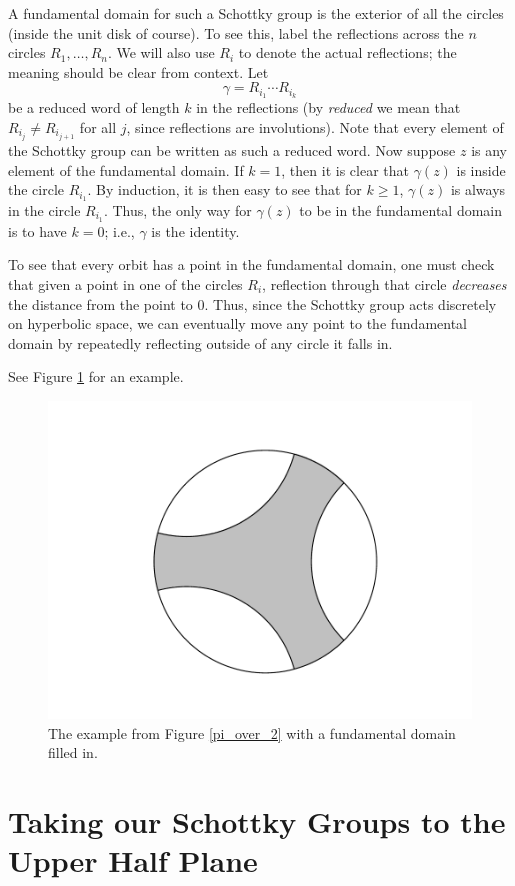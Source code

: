 \documentclass[]{article}
\begin{document}
A fundamental domain for such a Schottky group is the exterior of all the circles (inside the unit disk of course).
To see this, label the reflections across the $n$ circles $R_1, \dots, R_n$.
We will also use $R_i$ to denote the actual reflections; the meaning should be clear from context.
Let
$$
\gamma = R_{i_1}\cdots R_{i_k}
$$
be a reduced word of length $k$ in the reflections (by \textit{reduced} we mean that $R_{i_j} \neq R_{i_{j+1}}$ for all $j$, since reflections are involutions).
Note that every element of the Schottky group can be written as such a reduced word.
Now suppose $z$ is any element of the fundamental domain.
If $k = 1$, then it is clear that $\gamma(z)$ is inside the circle $R_{i_1}$.
By induction, it is then easy to see that for $k \geq 1$, $\gamma(z)$ is always in the circle $R_{i_1}$.
Thus, the only way for $\gamma(z)$ to be in the fundamental domain is to have $k = 0$; i.e., $\gamma$ is the identity.

To see that every orbit has a point in the fundamental domain, one must check that given a point in one of the circles $R_i$, reflection through that circle \textit{decreases} the distance from the point to $0$.
Thus, since the Schottky group acts discretely on hyperbolic space, we can eventually move any point to the fundamental domain by repeatedly reflecting outside of any circle it falls in.

See Figure \ref{disk_FD} for an example.

\begin{figure}[h]
	\centering
	\includegraphics[trim=110 40 100 50, clip, width=0.6\linewidth]{disk_FD.pdf}
	\caption{The example from Figure \ref{pi_over_2} with a fundamental domain filled in.}
	\label{disk_FD}
\end{figure}

\section*{Taking our Schottky Groups to the Upper Half Plane}
\end{document}
